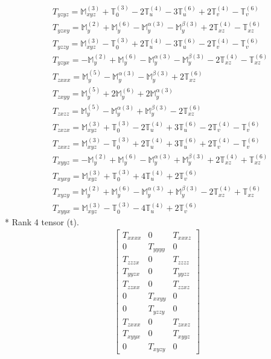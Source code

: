 \documentclass[fleqn,8pt,landscape]{jsarticle}
\begin{document}
\begin{align*}
& T_{yzyz} = \mathbb{M}_{xyz}^{(3)} + \mathbb{T}_{0}^{(3)} - 2 \mathbb{T}_{u}^{(4)} - 3 \mathbb{T}_{u}^{(6)} + 2 \mathbb{T}_{v}^{(4)} - \mathbb{T}_{v}^{(6)} \\
& T_{yzxy} = \mathbb{M}_{y}^{(2)} + \mathbb{M}_{y}^{(6)} - \mathbb{M}_{y}^{\alpha(3)} - \mathbb{M}_{y}^{\beta(3)} + 2 \mathbb{T}_{xz}^{(4)} - \mathbb{T}_{xz}^{(6)} \\
& T_{yzzy} = \mathbb{M}_{xyz}^{(3)} - \mathbb{T}_{0}^{(3)} + 2 \mathbb{T}_{u}^{(4)} - 3 \mathbb{T}_{u}^{(6)} - 2 \mathbb{T}_{v}^{(4)} - \mathbb{T}_{v}^{(6)} \\
& T_{yzyx} = - \mathbb{M}_{y}^{(2)} + \mathbb{M}_{y}^{(6)} - \mathbb{M}_{y}^{\alpha(3)} - \mathbb{M}_{y}^{\beta(3)} - 2 \mathbb{T}_{xz}^{(4)} - \mathbb{T}_{xz}^{(6)} \\
& T_{zxxx} = \mathbb{M}_{y}^{(5)} - \mathbb{M}_{y}^{\alpha(3)} - \mathbb{M}_{y}^{\beta(3)} + 2 \mathbb{T}_{xz}^{(6)} \\
& T_{zxyy} = \mathbb{M}_{y}^{(5)} + 2 \mathbb{M}_{y}^{(6)} + 2 \mathbb{M}_{y}^{\alpha(3)} \\
& T_{zxzz} = \mathbb{M}_{y}^{(5)} - \mathbb{M}_{y}^{\alpha(3)} + \mathbb{M}_{y}^{\beta(3)} - 2 \mathbb{T}_{xz}^{(6)} \\
& T_{zxzx} = \mathbb{M}_{xyz}^{(3)} + \mathbb{T}_{0}^{(3)} - 2 \mathbb{T}_{u}^{(4)} + 3 \mathbb{T}_{u}^{(6)} - 2 \mathbb{T}_{v}^{(4)} - \mathbb{T}_{v}^{(6)} \\
& T_{zxxz} = \mathbb{M}_{xyz}^{(3)} - \mathbb{T}_{0}^{(3)} + 2 \mathbb{T}_{u}^{(4)} + 3 \mathbb{T}_{u}^{(6)} + 2 \mathbb{T}_{v}^{(4)} - \mathbb{T}_{v}^{(6)} \\
& T_{xyyz} = - \mathbb{M}_{y}^{(2)} + \mathbb{M}_{y}^{(6)} - \mathbb{M}_{y}^{\alpha(3)} + \mathbb{M}_{y}^{\beta(3)} + 2 \mathbb{T}_{xz}^{(4)} + \mathbb{T}_{xz}^{(6)} \\
& T_{xyxy} = \mathbb{M}_{xyz}^{(3)} + \mathbb{T}_{0}^{(3)} + 4 \mathbb{T}_{u}^{(4)} + 2 \mathbb{T}_{v}^{(6)} \\
& T_{xyzy} = \mathbb{M}_{y}^{(2)} + \mathbb{M}_{y}^{(6)} - \mathbb{M}_{y}^{\alpha(3)} + \mathbb{M}_{y}^{\beta(3)} - 2 \mathbb{T}_{xz}^{(4)} + \mathbb{T}_{xz}^{(6)} \\
& T_{xyyx} = \mathbb{M}_{xyz}^{(3)} - \mathbb{T}_{0}^{(3)} - 4 \mathbb{T}_{u}^{(4)} + 2 \mathbb{T}_{v}^{(6)}
\end{align*}
* Rank 4 tensor (t).
\begin{align*}
\begin{bmatrix} T_{xxxx} & 0 & T_{xxxz} \\ 0 & T_{yyyy} & 0 \\ T_{zzzx} & 0 & T_{zzzz} \\ T_{yyzx} & 0 & T_{yyzz} \\ T_{zzxx} & 0 & T_{zzxz} \\ 0 & T_{xxyy} & 0 \\ 0 & T_{yzzy} & 0 \\ T_{zxxx} & 0 & T_{zxxz} \\ T_{xyyx} & 0 & T_{xyyz} \\ 0 & T_{xyzy} & 0 \end{bmatrix}
\end{align*}
\end{document}

